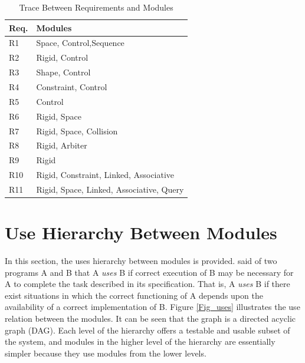 \documentclass[12pt]{article}
\begin{document}
\begin{table}[h!]
\centering
\begin{tabular}{p{} p{}}
\toprule
\textbf{Req.} & \textbf{Modules}\\
\midrule
R1 & Space, Control,Sequence\\
R2 & Rigid, Control\\
R3 & Shape, Control\\
R4 & Constraint, Control\\
R5 & Control\\
R6 & Rigid, Space\\
R7 & Rigid, Space, Collision\\
R8 & Rigid, Arbiter\\
R9 & Rigid\\
R10 & Rigid, Constraint, Linked, Associative\\
R11 & Rigid, Space, Linked, Associative, Query\\
\bottomrule
\end{tabular}
\caption{Trace Between Requirements and Modules}
\label{TblRT}
\end{table}

\section{Use Hierarchy Between Modules} \label{SecUse}

In this section, the uses hierarchy between modules is
provided. \citet{Parnas1978} said of two programs A and B that A {\em uses} B if
correct execution of B may be necessary for A to complete the task described in
its specification. That is, A {\em uses} B if there exist situations in which
the correct functioning of A depends upon the availability of a correct
implementation of B.  Figure \ref{Fig_uses} illustrates the use relation between
the modules. It can be seen that the graph is a directed acyclic graph
(DAG). Each level of the hierarchy offers a testable and usable subset of the
system, and modules in the higher level of the hierarchy are essentially simpler
because they use modules from the lower levels.
\end{document}
